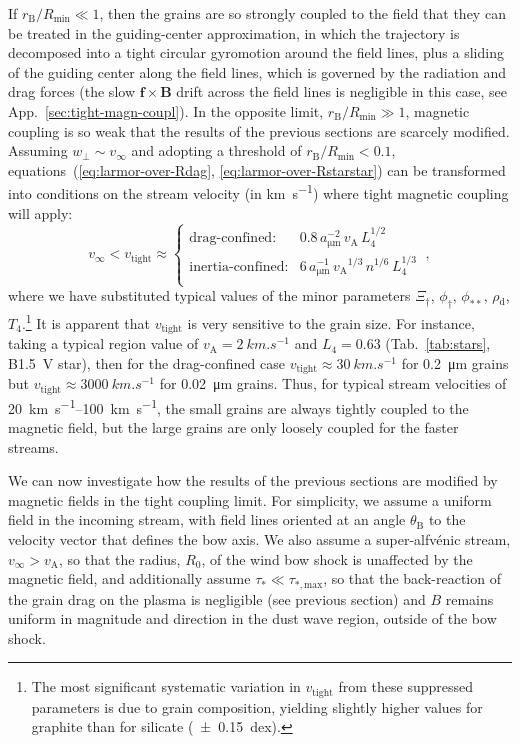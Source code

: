 \message{ !name(dusty-bow-wave.tex)}\documentclass[useAMS, usenatbib, a4paper]{mnras}
\newcommand{\grain}{\ensuremath{_{\text{d}}}}
\newcommand{\B}{\ensuremath{_{\scriptscriptstyle\text{B}}}}
\newcommand{\alfven}{\ensuremath{_{\scriptscriptstyle\text{A}}}}
\newcommand\Rmin{\ensuremath{R_{\scriptscriptstyle\text{min}}}}
\begin{document}
If \(r\B / \Rmin \ll 1\), then the grains are so strongly coupled to the
field that they can be treated in the guiding-center approximation, in
which the trajectory is decomposed into a tight circular gyromotion
around the field lines, plus a sliding of the guiding center along the
field lines, which is governed by the radiation and drag forces (the
slow \(\bm{f} \times \bm{B}\) drift across the field lines is negligible in
this case, see App.~\ref{sec:tight-magn-coupl}).  In the opposite
limit, \(r\B / \Rmin \gg 1\), magnetic coupling is so weak that the
results of the previous sections are scarcely modified.  Assuming
\(w_\perp \sim v_\infty\) and adopting a threshold of
\(r\B / \Rmin < 0.1\), equations~(\ref{eq:larmor-over-Rdag},
\ref{eq:larmor-over-Rstarstar}) can be transformed into conditions on
the stream velocity (in \si{km.s^{-1}}) where tight magnetic coupling
will apply: \newcommand\freeze{\ensuremath{_{\text{tight}}}}
\begin{equation}
  \label{eq:velocity-strong-B-coupling}
  v_{\infty} < v\freeze \approx
  \begin{cases}
    \text{drag-confined:}
    & 0.8 \, a_{\si{\um}}^{-2} \, v\alfven \, L_4^{1/2}\\
    \text{inertia-confined:}
    & 6 \, a_{\si{\um}}^{-1} \, v\alfven^{1/3} \, n^{1/6} \, L_4^{1/3} \\
  \end{cases} \ ,
\end{equation}
where we have substituted typical values of the minor parameters
\(\Xi_\dag\), \(\phi_{\dag}\), \(\phi_{**}\), \(\rho\grain\),
\(T_4\).\footnote{%
  The most significant systematic variation in \(v\freeze\) from these
  suppressed parameters is due to grain composition, yielding slightly
  higher values for graphite than for silicate (\SI{+-0.15}{dex}).} %
It is apparent that \(v\freeze\) is very sensitive to the grain size.
For instance, taking a typical \hii{} region value of
\(v\alfven = \SI{2}{km.s^{-1}}\) \citep{Arthur:2011a} and
\(L_4 = 0.63\) (Tab.~\ref{tab:stars}, B1.5~V star), then for the
drag-confined case \(v\freeze \approx \SI{30}{km.s^{-1}}\) for \SI{0.2}{\um}
grains but \(v\freeze \approx \SI{3000}{km.s^{-1}}\) for \SI{0.02}{\um}
grains. Thus, for typical stream velocities of
\SIrange{20}{100}{km.s^{-1}}, the small grains are always tightly
coupled to the magnetic field, but the large grains are only loosely
coupled for the faster streams.

We can now investigate how the results of the previous sections are
modified by magnetic fields in the tight coupling limit.  For
simplicity, we assume a uniform field in the incoming stream, with
field lines oriented at an angle \(\theta\B\) to the velocity vector that
defines the bow axis.  We also assume a super-alfvénic stream,
\(v_\infty > v\alfven\), so that the radius, \(R_0\), of the wind bow shock
is unaffected by the magnetic field, and additionally assume
\(\tau_* \ll \tau_{*, \text{max}}\), so that the back-reaction of the grain
drag on the plasma is negligible (see previous section) and \(B\)
remains uniform in magnitude and direction in the dust wave region,
outside of the bow shock.
\end{document}
